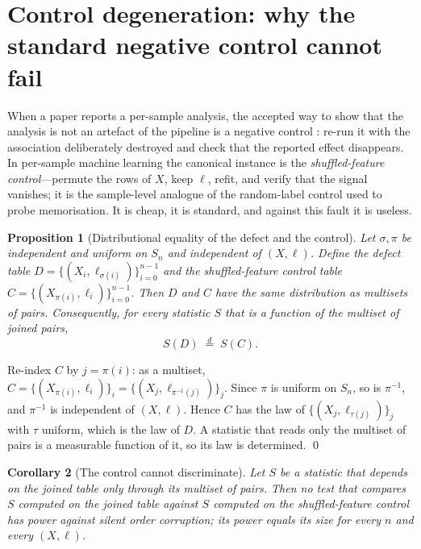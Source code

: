 \documentclass[a4paper,fleqn]{cas-sc}
\newtheorem{proposition}{Proposition}
\newtheorem{corollary}[proposition]{Corollary}
\begin{document}
\section{Control degeneration: why the standard negative control cannot fail}
\label{sec:degeneracy}

When a paper reports a per-sample analysis, the accepted way to show that the
analysis is not an artefact of the pipeline is a negative control
\citep{lipsitch2010}: re-run it with the association deliberately destroyed and
check that the reported effect disappears. In per-sample machine learning the
canonical instance is the \emph{shuffled-feature control}---permute the rows of
$X$, keep $\ell$, refit, and verify that the signal vanishes; it is the
sample-level analogue of the random-label control used to probe memorisation. It
is cheap, it is standard, and against this fault it is useless.

\begin{proposition}[Distributional equality of the defect and the control]
\label{prop:degeneracy}
Let $\sigma,\pi$ be independent and uniform on $S_n$ and independent of
$(X,\ell)$. Define the \emph{defect} table
$D = \{(X_i, \ell_{\sigma(i)})\}_{i=0}^{n-1}$ and the \emph{shuffled-feature
control} table $C = \{(X_{\pi(i)}, \ell_i)\}_{i=0}^{n-1}$. Then $D$ and $C$ have
the same distribution as multisets of pairs. Consequently, for every statistic $S$
that is a function of the multiset of joined pairs,
\begin{equation}
S(D) \;\overset{d}{=}\; S(C).
\end{equation}
\end{proposition}

\begin{pf}
Re-index $C$ by $j = \pi(i)$: as a multiset,
$C = \{(X_{\pi(i)},\ell_i)\}_i = \{(X_j, \ell_{\pi^{-1}(j)})\}_j$. Since $\pi$ is
uniform on $S_n$, so is $\pi^{-1}$, and $\pi^{-1}$ is independent of $(X,\ell)$.
Hence $C$ has the law of $\{(X_j,\ell_{\tau(j)})\}_j$ with $\tau$ uniform, which
is the law of $D$. A statistic that reads only the multiset of pairs is a
measurable function of it, so its law is determined. \qed
\end{pf}

\begin{corollary}[The control cannot discriminate]
\label{cor:cannot}
Let $S$ be a statistic that depends on the joined table only through its multiset
of pairs. Then no test that compares $S$ computed on the joined table against $S$
computed on the shuffled-feature control has power against silent order
corruption; its power equals its size for every $n$ and every $(X,\ell)$.
\end{corollary}
\end{document}
